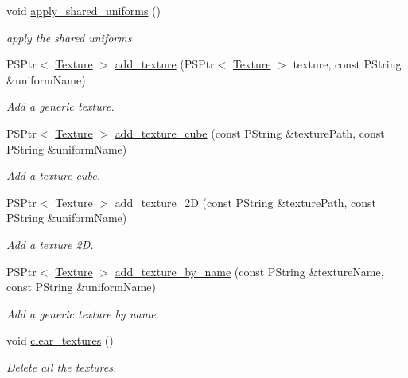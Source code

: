 \begin{DoxyCompactItemize}
void \mbox{\hyperlink{classprz_1_1_material_a97b7619874422fe0f154f85f5ac14a93}{apply\+\_\+shared\+\_\+uniforms}} ()
\begin{DoxyCompactList}\small\item\em apply the shared uniforms \end{DoxyCompactList}\item 
P\+S\+Ptr$<$ \mbox{\hyperlink{classprz_1_1_texture}{Texture}} $>$ \mbox{\hyperlink{classprz_1_1_material_ac8ce613c4cb5af860132c5955709a31d}{add\+\_\+texture}} (P\+S\+Ptr$<$ \mbox{\hyperlink{classprz_1_1_texture}{Texture}} $>$ texture, const P\+String \&uniform\+Name)
\begin{DoxyCompactList}\small\item\em Add a generic texture. \end{DoxyCompactList}\item 
P\+S\+Ptr$<$ \mbox{\hyperlink{classprz_1_1_texture}{Texture}} $>$ \mbox{\hyperlink{classprz_1_1_material_aeecf13bf1f8c559f520a2e3400b3f7bf}{add\+\_\+texture\+\_\+cube}} (const P\+String \&texture\+Path, const P\+String \&uniform\+Name)
\begin{DoxyCompactList}\small\item\em Add a texture cube. \end{DoxyCompactList}\item 
P\+S\+Ptr$<$ \mbox{\hyperlink{classprz_1_1_texture}{Texture}} $>$ \mbox{\hyperlink{classprz_1_1_material_a860fb902b7f2ce6c31956034112666f5}{add\+\_\+texture\+\_\+2D}} (const P\+String \&texture\+Path, const P\+String \&uniform\+Name)
\begin{DoxyCompactList}\small\item\em Add a texture 2D. \end{DoxyCompactList}\item 
P\+S\+Ptr$<$ \mbox{\hyperlink{classprz_1_1_texture}{Texture}} $>$ \mbox{\hyperlink{classprz_1_1_material_a16f993fb8665220f51313df4285bca53}{add\+\_\+texture\+\_\+by\+\_\+name}} (const P\+String \&texture\+Name, const P\+String \&uniform\+Name)
\begin{DoxyCompactList}\small\item\em Add a generic texture by name. \end{DoxyCompactList}\item 
void \mbox{\hyperlink{classprz_1_1_material_aa3c07270df05e4f8048974e20599810d}{clear\+\_\+textures}} ()
\begin{DoxyCompactList}\small\item\em Delete all the textures. \end{DoxyCompactList}\item 

\end{DoxyCompactItemize}
